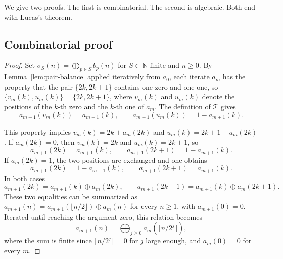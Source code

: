 \documentclass[12pt,reqno]{article}
\newcommand{\N}{\mathbb{N}}
\theoremstyle{plain}
\theoremstyle{definition}
\begin{document}
We give two proofs. The first is combinatorial. The second is algebraic. Both end with Lucas's theorem.

\subsection{Combinatorial proof}

\begin{proof}
Set $\sigma_S(n) = \bigoplus_{p \in S} b_p(n)$ for $S \subset \N$ finite and $n \ge 0$. By Lemma~\ref{lem:pair-balance} applied iteratively from $a_0$, each iterate $a_m$ has the property that the pair $\{2k, 2k+1\}$ contains one zero and one one, so $\{v_m(k), u_m(k)\} = \{2k, 2k+1\}$, where $v_m(k)$ and $u_m(k)$ denote the positions of the $k$-th zero and the $k$-th one of $a_m$. The definition of $\mathcal{T}$ gives
\[
  a_{m+1}(v_m(k)) = a_{m+1}(k), \qquad a_{m+1}(u_m(k)) = 1 - a_{m+1}(k).
\]

This property implies $v_m(k) = 2k + a_m(2k)$ and $u_m(k) = 2k + 1 - a_m(2k)$. If $a_m(2k) = 0$, then $v_m(k) = 2k$ and $u_m(k) = 2k+1$, so
\[
  a_{m+1}(2k) = a_{m+1}(k), \qquad a_{m+1}(2k+1) = 1 - a_{m+1}(k).
\]
If $a_m(2k) = 1$, the two positions are exchanged and one obtains
\[
  a_{m+1}(2k) = 1 - a_{m+1}(k), \qquad a_{m+1}(2k+1) = a_{m+1}(k).
\]
In both cases
\[
  a_{m+1}(2k) = a_{m+1}(k) \oplus a_m(2k), \qquad a_{m+1}(2k+1) = a_{m+1}(k) \oplus a_m(2k+1).
\]
These two equalities can be summarized as $a_{m+1}(n) = a_{m+1}(\lfloor n/2 \rfloor) \oplus a_m(n)$ for every $n \ge 1$, with $a_{m+1}(0) = 0$. Iterated until reaching the argument zero, this relation becomes
\[
  a_{m+1}(n) = \bigoplus_{j \ge 0} a_m(\lfloor n/2^j \rfloor),
\]
where the sum is finite since $\lfloor n/2^j \rfloor = 0$ for $j$ large enough, and $a_m(0) = 0$ for every $m$.


\end{proof}
\end{document}
